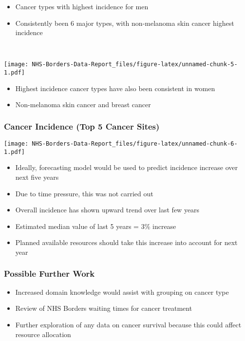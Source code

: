 \documentclass[
]{article}
\providecommand{\tightlist}{%
  \setlength{\itemsep}{0pt}\setlength{\parskip}{0pt}}
\begin{document}
\begin{itemize}
\tightlist
\item
  Cancer types with highest incidence for men
\item
  Consistently been 6 major types, with non-melanoma skin cancer highest
  incidence
\end{itemize}

\(~\) \(~\) \(~\)

\texttt{[image: NHS-Borders-Data-Report\_files/figure-latex/unnamed-chunk-5-1.pdf]}

\begin{itemize}
\tightlist
\item
  Highest incidence cancer types have also been consistent in women
\item
  Non-melanoma skin cancer and breast cancer \(~\) \(~\) \(~\)
\end{itemize}

\hypertarget{cancer-incidence-top-5-cancer-sites}{%
\subsubsection{Cancer Incidence (Top 5 Cancer
Sites)}\label{cancer-incidence-top-5-cancer-sites}}

\texttt{[image: NHS-Borders-Data-Report\_files/figure-latex/unnamed-chunk-6-1.pdf]}

\begin{itemize}
\tightlist
\item
  Ideally, forecasting model would be used to predict incidence increase
  over next five years
\item
  Due to time pressure, this was not carried out
\item
  Overall incidence has shown upward trend over last few years
\item
  Estimated median value of last 5 years = 3\% increase
\item
  Planned available resources should take this increase into account for
  next year
\end{itemize}

\hypertarget{possible-further-work}{%
\subsubsection{Possible Further Work}\label{possible-further-work}}

\begin{itemize}
\tightlist
\item
  Increased domain knowledge would assist with grouping on cancer type
\item
  Review of NHS Borders waiting times for cancer treatment
\item
  Further exploration of any data on cancer survival because this could
  affect resource allocation
\end{itemize}
\end{document}
